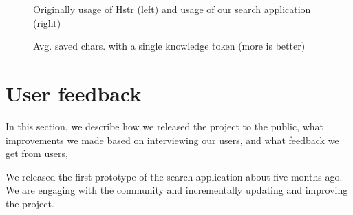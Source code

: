 \begin{figure}
\centering
{}\hfill
{}
\caption{Avg. saved chars. with a single knowledge token (more is better)}
\small{Originally usage of Hstr (left) and usage of our search application (right)}
\label{eval-metrics-plot-dist-1-chars}
\end{figure}


\section{User feedback}

In this section, we describe how we released the project to the public, what improvements we made based on interviewing our users, and what feedback we get from users,

We released the first prototype of the search application about five months ago. We are engaging with the community and incrementally updating and improving the project. 

